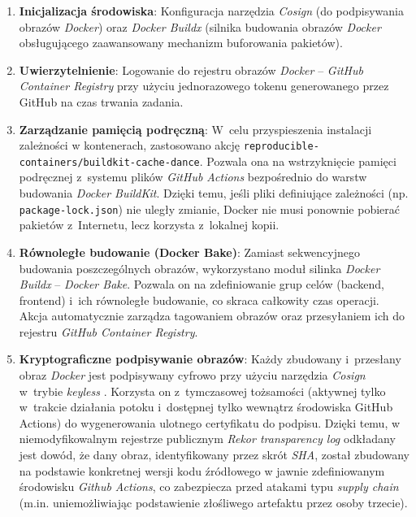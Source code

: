 \begin{enumerate}
    \item \textbf{Inicjalizacja środowiska}: Konfiguracja narzędzia \textit{Cosign} \cite{sigstore_security} (do podpisywania obrazów \textit{Docker}) oraz \textit{Docker Buildx} (silnika budowania obrazów \textit{Docker} obsługującego zaawansowany mechanizm buforowania pakietów).
    \item \textbf{Uwierzytelnienie}: Logowanie do rejestru obrazów \textit{Docker} -- \textit{GitHub Container Registry} przy użyciu jednorazowego tokenu generowanego przez GitHub na czas trwania zadania.
    \item \textbf{Zarządzanie pamięcią podręczną}: W~celu przyspieszenia instalacji zależności w kontenerach, zastosowano akcję \texttt{reproducible-containers/buildkit-cache-dance}. Pozwala ona na wstrzyknięcie pamięci podręcznej z~systemu plików \textit{GitHub Actions} bezpośrednio do warstw budowania \textit{Docker BuildKit}. Dzięki temu, jeśli pliki definiujące zależności (np. \texttt{package-lock.json}) nie uległy zmianie, Docker nie musi ponownie pobierać pakietów z~Internetu, lecz korzysta z~lokalnej kopii.
    \item \textbf{Równoległe budowanie (Docker Bake)}: Zamiast sekwencyjnego budowania poszczególnych obrazów, wykorzystano moduł silinka \textit{Docker Buildx} -- \textit{Docker Bake}. Pozwala on na zdefiniowanie grup celów (backend, frontend) i~ich równoległe budowanie, co skraca całkowity czas operacji. Akcja automatycznie zarządza tagowaniem obrazów oraz przesyłaniem ich do rejestru \textit{GitHub Container Registry}.
    \item \textbf{Kryptograficzne podpisywanie obrazów}: Każdy zbudowany i~przesłany obraz \textit{Docker} jest podpisywany cyfrowo przy użyciu narzędzia \textit{Cosign} w~trybie \textit{keyless} \cite{keyless}. Korzysta on z~tymczasowej tożsamości (aktywnej tylko w~trakcie działania potoku i~dostępnej tylko wewnątrz środowiska GitHub Actions) do wygenerowania ulotnego certyfikatu do podpisu. Dzięki temu, w niemodyfikowalnym rejestrze publicznym \textit{Rekor transparency log} \cite{rekor} odkładany jest dowód, że dany obraz, identyfikowany przez skrót \textit{SHA}, został zbudowany na podstawie konkretnej wersji kodu źródłowego w jawnie zdefiniowanym środowisku \textit{Github Actions}, co zabezpiecza przed atakami typu \textit{supply chain} (m.in. uniemożliwiając podstawienie złośliwego artefaktu przez osoby trzecie).
\end{enumerate}


